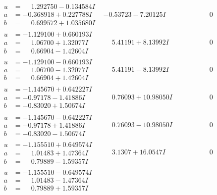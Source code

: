 \documentclass[1p]{elsarticle_modified}
\theoremstyle{definition}
\begin{document}
$$\begin{array}{c|c|c}
\begin{aligned}
u &= \phantom{-}1.292750 - 0.134584 I \\
a &= -0.368918 + 0.227788 I \\
b &= \phantom{-}0.699572 + 1.035680 I\end{aligned}
 & -0.53723 - 7.20125 I & \phantom{-0.000000 } 0 \\ \hline\begin{aligned}
u &= -1.129100 + 0.660193 I \\
a &= \phantom{-}1.06700 + 1.32077 I \\
b &= \phantom{-}0.66904 - 1.42604 I\end{aligned}
 & \phantom{-}5.41191 + 8.13992 I & \phantom{-0.000000 } 0 \\ \hline\begin{aligned}
u &= -1.129100 - 0.660193 I \\
a &= \phantom{-}1.06700 - 1.32077 I \\
b &= \phantom{-}0.66904 + 1.42604 I\end{aligned}
 & \phantom{-}5.41191 - 8.13992 I & \phantom{-0.000000 } 0 \\ \hline\begin{aligned}
u &= -1.145670 + 0.642227 I \\
a &= -0.97178 - 1.41886 I \\
b &= -0.83020 + 1.50674 I\end{aligned}
 & \phantom{-}0.76093 + 10.98050 I & \phantom{-0.000000 } 0 \\ \hline\begin{aligned}
u &= -1.145670 - 0.642227 I \\
a &= -0.97178 + 1.41886 I \\
b &= -0.83020 - 1.50674 I\end{aligned}
 & \phantom{-}0.76093 - 10.98050 I & \phantom{-0.000000 } 0 \\ \hline\begin{aligned}
u &= -1.155510 + 0.649574 I \\
a &= \phantom{-}1.01483 + 1.47364 I \\
b &= \phantom{-}0.79889 - 1.59357 I\end{aligned}
 & \phantom{-}3.1307 + 16.0547 I & \phantom{-0.000000 } 0 \\ \hline\begin{aligned}
u &= -1.155510 - 0.649574 I \\
a &= \phantom{-}1.01483 - 1.47364 I \\
b &= \phantom{-}0.79889 + 1.59357 I\end{aligned}

\end{array}$$
\end{document}
